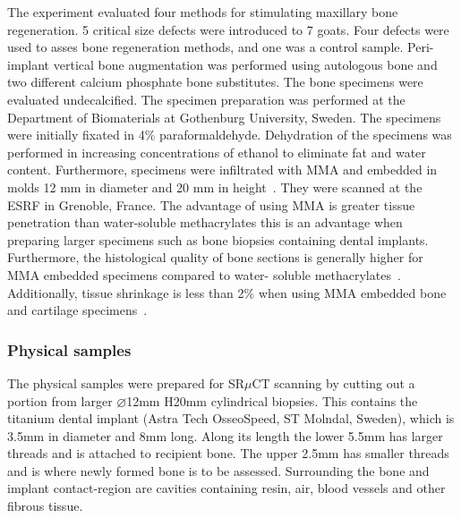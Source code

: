 The experiment evaluated four methods for stimulating maxillary bone regeneration.
5 critical size defects were introduced to 7 goats.
 Four defects were used to asses bone regeneration methods, and one was a control sample.
 Peri-implant vertical bone augmentation was performed using autologous bone and two different
 calcium phosphate bone substitutes. The bone specimens were evaluated undecalcified. The
 specimen preparation was performed at the Department of Biomaterials at Gothenburg University,
 Sweden. The specimens were initially fixated in 4\% paraformaldehyde. Dehydration of the
 specimens was performed in increasing concentrations of ethanol to eliminate fat and water
 content. Furthermore, specimens were infiltrated with MMA and embedded in molds 12 mm in
 diameter and 20 mm in height~\cite{donath1982,donath1993,erben1997}. They were scanned at the ESRF
 in Grenoble, France. The advantage of using MMA is greater tissue penetration than water-soluble
 methacrylates this is an advantage when preparing larger specimens such as bone biopsies
 containing dental implants. Furthermore, the histological quality of bone sections is generally
 higher for MMA embedded specimens compared to water- soluble methacrylates~\cite{erben1997}.
 Additionally, tissue shrinkage is less than 2\% when using MMA embedded bone and cartilage
 specimens~\cite{ferguson1999}.


\subsubsection{Physical samples}

The physical samples were prepared for SR$\mu$CT scanning by cutting out a portion from larger
 $\diameter$12mm H20mm cylindrical biopsies. %
This contains the titanium dental implant (Astra Tech OsseoSpeed,
ST Molndal, Sweden), which is 3.5mm in diameter and 8mm long. Along its length the lower 5.5mm
has larger threads and is attached to recipient bone. The upper 2.5mm has smaller threads and
is where newly formed bone is to be assessed. Surrounding the bone and implant contact-region
are cavities containing resin, air, blood vessels and other fibrous tissue.

